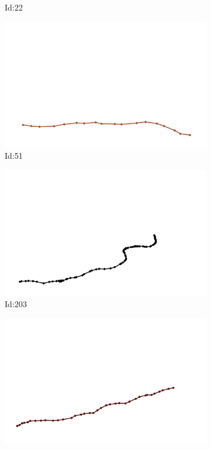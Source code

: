 \documentclass[12pt,twoside]{report}
\begin{document}
\begin{figure}
\begin{subfigure}[b]{0.20\textwidth}
\caption{Id:22}
\end{subfigure}
\begin{subfigure}[b]{0.20\textwidth}
\centering
\includegraphics[width=\textwidth]{../trajectories/51.png}
\caption{Id:51}
\end{subfigure}
\begin{subfigure}[b]{0.20\textwidth}
\centering
\includegraphics[width=\textwidth]{../trajectories/203.png}
\caption{Id:203}
\end{subfigure}
\begin{subfigure}[b]{0.20\textwidth}
\centering
\includegraphics[width=\textwidth]{../trajectories/229.png}

\end{subfigure}
\end{figure}
\end{document}

